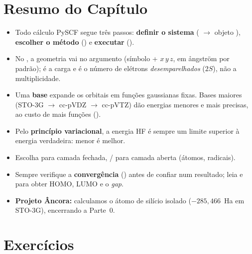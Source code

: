 \section*{Resumo do Capítulo}

\begin{itemize}[leftmargin=*]
  \item Todo cálculo PySCF segue três passos: \textbf{definir o sistema}
        ( $\rightarrow$ objeto ), \textbf{escolher o método}
        () e \textbf{executar} ().
  \item No , a geometria vai no argumento  (símbolo + $x\,y\,z$,
        em ångström por padrão);  é a carga e  é o número de
        elétrons \emph{desemparelhados} ($2S$), não a multiplicidade.
  \item Uma \textbf{base} expande os orbitais em funções gaussianas fixas. Bases
        maiores (STO-3G $\rightarrow$ cc-pVDZ $\rightarrow$ cc-pVTZ) dão energias
        menores e mais precisas, ao custo de mais funções ().
  \item Pelo \textbf{princípio variacional}, a energia HF é sempre um limite
        superior à energia verdadeira: menor é melhor.
  \item Escolha  para camada fechada, / para camada
        aberta (átomos, radicais).
  \item Sempre verifique a \textbf{convergência} () antes
        de confiar num resultado; leia  e  para obter
        HOMO, LUMO e o \emph{gap}.
  \item \textbf{Projeto Âncora:} calculamos o átomo de silício isolado
        ($-285{,}466$~Ha em STO-3G), encerrando a Parte~0.
\end{itemize}

\section*{Exercícios}

